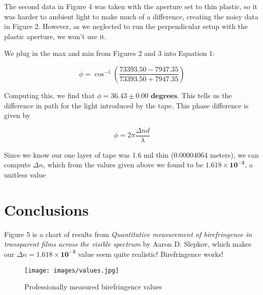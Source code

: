 \documentclass[12pt,letterpaper]{article}
\begin{document}
The second data in Figure 4 was taken with the aperture set to thin plastic, so it was harder to ambient light to make much of a difference, creating the noisy data in Figure 2. However, as we neglected to run the perpendicular setup with the plastic aperture, we won't use it. 

We plug in the max and min from Figures 2 and 3 into Equation 1:

\begin{equation*}
    \phi = \cos^{-1}\left(\frac{73393.50 - 7947.35}{73393.50 + 7947.35}\right)
\end{equation*}

Computing this, we find that $\phi = \mathbf{36.43 \pm 0.00} \textbf{ degrees}$. This tells us the difference in path for the light introduced by the tape. This phase difference is given by

\begin{equation}
    \phi=2\pi\frac{\Delta nd}{\lambda}
\end{equation}

Since we know our one layer of tape was 1.6 mil thin (0.00004064 meters), we can compute $\Delta n$, which from the values given above we found to be $\mathbf{1.618\times10^{-3}}$, a unitless value

\section{Conclusions}

Figure 5 is a chart of results from \textit{Quantitative measurement of birefringence in transparent films across the visible spectrum}
by Aaron D. Slepkov, which makes our $\Delta n = \mathbf{1.618\times10^{-3}}$ value seem quite realistic! Birefringence works!

\begin{figure}[ht]
    \centering
    \texttt{[image: images/values.jpg]}
    \caption{Professionally measured birefringence values}
    \label{fig:real}
\end{figure}

% 
% 
\end{document}
